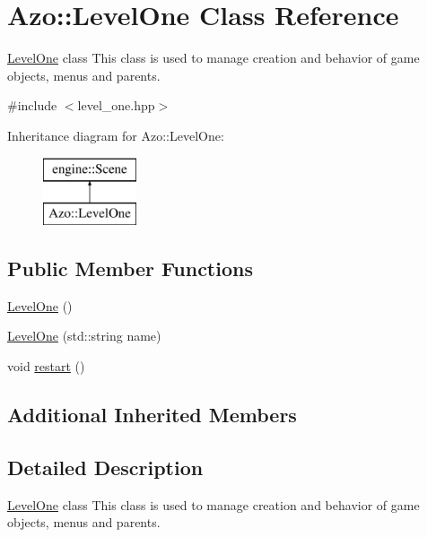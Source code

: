 \hypertarget{class_azo_1_1_level_one}{}\section{Azo\+:\+:Level\+One Class Reference}
\label{class_azo_1_1_level_one}


\hyperlink{class_azo_1_1_level_one}{Level\+One} class This class is used to manage creation and behavior of game objects, menus and parents.  




{\ttfamily \#include $<$level\+\_\+one.\+hpp$>$}

Inheritance diagram for Azo\+:\+:Level\+One\+:\begin{figure}[H]
\begin{center}
\leavevmode
\includegraphics[height=2.000000cm]{class_azo_1_1_level_one}
\end{center}
\end{figure}
\subsection*{Public Member Functions}
\begin{DoxyCompactItemize}
\item 
\hyperlink{class_azo_1_1_level_one_a3fe4df62466654e6e7617377c8bd67a7}{Level\+One} ()
\item 
\hyperlink{class_azo_1_1_level_one_a7162ded32f3cc966d0e3304666beb878}{Level\+One} (std\+::string name)
\item 
void \hyperlink{class_azo_1_1_level_one_ac388145a996f6663e2ae757f026f07f1}{restart} ()
\end{DoxyCompactItemize}
\subsection*{Additional Inherited Members}


\subsection{Detailed Description}
\hyperlink{class_azo_1_1_level_one}{Level\+One} class This class is used to manage creation and behavior of game objects, menus and parents. 

